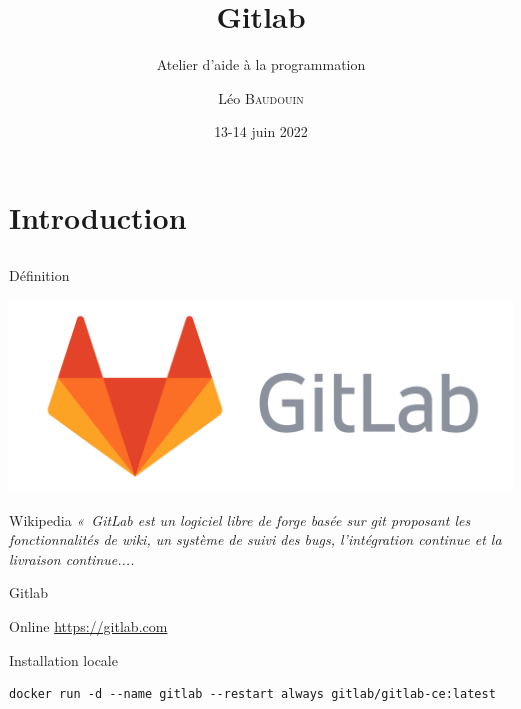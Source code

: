 \documentclass{beamer}
\title{Gitlab}
\subtitle{Atelier d'aide à la programmation}
\author{L\'eo \textsc{Baudouin}}
\institute{
  {\url{baudouin.leo @ gmail.com}}
}
\date{13-14 juin 2022}
\begin{document}
\begin{frame}
  \titlepage
\end{frame}

\section{Introduction}
\subsection{}

\begin{frame}{Définition}


\begin{center}
\includegraphics[width=0.5\linewidth]{images/gitlab-logo}
\end{center}

\begin{block}{Wikipedia}
{\it 
«~GitLab est un logiciel libre de forge basée sur git proposant les fonctionnalités de wiki, un système de suivi des bugs, l’intégration continue et la livraison continue....}
\end{block}
\end{frame}



\begin{frame}[fragile]{Gitlab}

\begin{block}{Online}
\href{https://gitlab.com}{https://gitlab.com}
\end{block}

\begin{block}{Installation locale}
\scriptsize
\begin{verbatim}
docker run -d --name gitlab --restart always gitlab/gitlab-ce:latest
\end{verbatim}
\end{block}


\end{frame}
\end{document}
